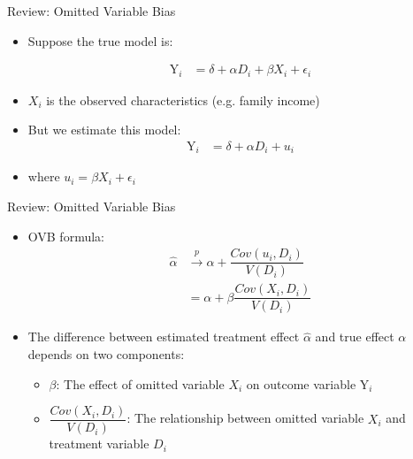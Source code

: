 \documentclass[hyperref={pdfpagelabels=false}]{beamer}
\begin{document}
\begin{frame}{Review: Omitted Variable Bias}
	
	\begin{itemize}
		\item Suppose the true model is:
		
		\begin{align*}
		\mathrm{Y}_i &= \delta + \alpha D_i + \beta X_{i} + \epsilon_{i}
		\end{align*}
		
		\vspace{0.3cm}
		\item $X_{i}$ is the observed characteristics (e.g. family income)
		\vspace{0.3cm}
		\item But we estimate this model:
		\begin{align*}
		\mathrm{Y}_i &= \delta + \alpha D_i + u_i	
		\end{align*}
		\item where $u_i = \beta X_{i} + \epsilon_{i}$
		
	\end{itemize}
	
\end{frame}



\begin{frame}{Review: Omitted Variable Bias}
	
	\begin{itemize}
		
		
		\item OVB formula: 
		\begin{equation*}
		\begin{aligned}
		\hat{\alpha} &\overset{p}{\rightarrow} \alpha + \dfrac{Cov(u_{i},D_{i})}{V(D_{i})}  \\	
		&= \alpha + \beta \dfrac{Cov(X_{i},D_{i})}{V(D_{i})}
		\end{aligned}	
		\end{equation*}
		\item The difference between estimated treatment effect $\hat{\alpha}$ and true effect $\alpha$ depends on two components:
		\vspace{0.3cm}
		\begin{itemize}
			\item[1] $\beta$: The effect of omitted variable $X_{i}$ on outcome variable $\mathrm{Y}_{i}$ 
			\vspace{0.3cm}
			\item[2] $\dfrac{Cov(X_{i},D_{i})}{V(D_{i})}$: The relationship between omitted variable $X_{i}$ and treatment variable $D_{i}$ 
			
			
		\end{itemize}
		
	\end{itemize}
	
\end{frame}
\end{document}
